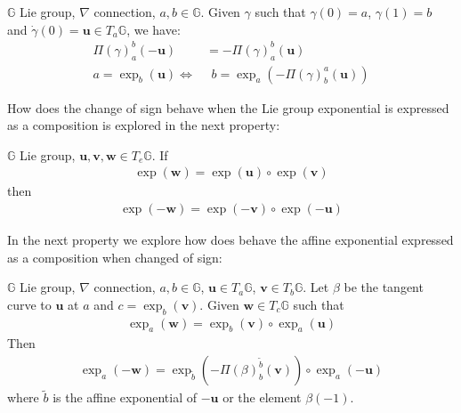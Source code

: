 \begin{theorem}[Inversion]
	$\mathbb{G}$ Lie group, $\nabla$ connection, $a,b\in\mathbb{G}$. Given $\gamma$ such that $\gamma(0)= a$, $\gamma(1)=b$ and $\dot{\gamma}(0)=\mathbf{u}\in T_{a}\mathbb{G}$, we have:
	\begin{align}
		\Pi(\gamma)_{a}^{b}(-\mathbf{u}) &= -\Pi(\gamma)_{a}^{b}(\mathbf{u}) \\
		a = \exp_{b}(\mathbf{u}) \Longleftrightarrow& \phantom{z} b = \exp_{a}(-\Pi(\gamma)_{b}^{a}(\mathbf{u}))
	\end{align}
\end{theorem}
How does the change of sign behave when the Lie group exponential is expressed as a composition is explored in the next property:
\begin{theorem}
	$\mathbb{G}$ Lie group, $\mathbf{u}, \mathbf{v}, \mathbf{w}\in T_{e}\mathbb{G}$. If
	\begin{align*}
		\exp(\mathbf{w}) = \exp(\mathbf{u}) \circ \exp(\mathbf{v})
	\end{align*}
	then
	\begin{align*}
		\exp(\mathbf{-w}) = \exp(\mathbf{-v}) \circ \exp(\mathbf{-u})
	\end{align*}
\end{theorem}
In the next property we explore how does behave the affine exponential expressed as a composition when changed of sign:
\begin{theorem}
	$\mathbb{G}$ Lie group, $\nabla$ connection, $a,b\in\mathbb{G}$, $\mathbf{u}\in T_{a}\mathbb{G}$, $\mathbf{v}\in T_{b}\mathbb{G}$. Let $\beta$ be the tangent curve to $\mathbf{u}$ at $a$ and $c= \exp_{b}(\mathbf{v})$. Given $\mathbf{w} \in T_{c}\mathbb{G}$ such that 
	\begin{align*}
		\exp_{a}(\mathbf{w}) = \exp_{b}(\mathbf{v}) \circ \exp_{a}(\mathbf{u})
	\end{align*}
	Then
	\begin{align*}
		\exp_{a}(-\mathbf{w}) = \exp_{\tilde{b}}(-\Pi(\beta)_{b}^{\tilde{b}}(\mathbf{v})) \circ \exp_{a}(-\mathbf{u})
	\end{align*}
	where $\tilde{b}$ is the affine exponential of $-\mathbf{u}$ or the element $\beta(-1)$.
\end{theorem}


